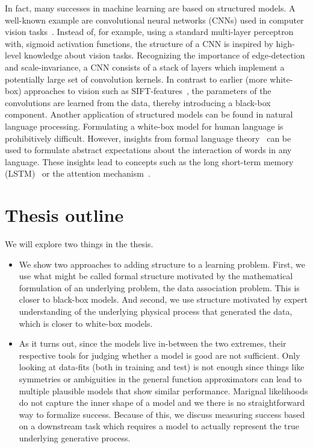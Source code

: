 In fact, many successes in machine learning are based on structured models.
A well-known example are convolutional neural networks (CNNs) used in computer vision tasks~\parencite{lecun_backpropagation_1989}.
Instead of, for example, using a standard multi-layer perceptron with, sigmoid activation functions, the structure of a CNN is inspired by high-level knowledge about vision tasks.
Recognizing the importance of edge-detection and scale-invariance, a CNN consists of a stack of layers which implement a potentially large set of convolution kernels.
In contrast to earlier (more white-box) approaches to vision such as SIFT-features~\parencite{lowe_object_1999}, the parameters of the convolutions are learned from the data, thereby introducing a black-box component.
Another application of structured models can be found in natural language processing.
Formulating a white-box model for human language is prohibitively difficult.
However, insights from formal language theory~\parencite{chomsky_aspects_2014} can be used to formulate abstract expectations about the interaction of words in any language.
These insights lead to concepts such as the long short-term memory (LSTM)~\parencite{hochreiter_long_1997} or the attention mechanism~\parencite{bahdanau_neural_2014,chorowski_attention-based_2015}.


\section{Thesis outline}
We will explore two things in the thesis.
\begin{itemize}
    \item We show two approaches to adding structure to a learning problem.
          First, we use what might be called formal structure motivated by the mathematical formulation of an underlying problem, the data association problem.
          This is closer to black-box models.
          And second, we use structure motivated by expert understanding of the underlying physical process that generated the data, which is closer to white-box models.
    \item As it turns out, since the models live in-between the two extremes, their respective tools for judging whether a model is good are not sufficient.
          Only looking at data-fits (both in training and test) is not enough since things like symmetries or ambiguities in the general function approximators can lead to multiple plausible models that show similar performance.
          Marignal likelihoods do not capture the inner shape of a model and we there is no straightforward way to formalize success.
          Because of this, we discuss measuring success based on a downstream task which requires a model to actually represent the true underlying generative process.
\end{itemize}



